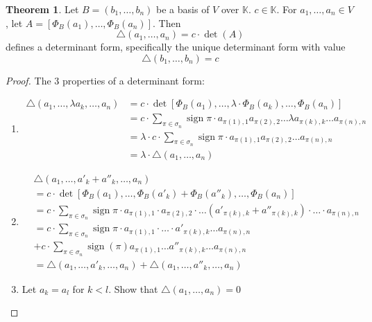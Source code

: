 \documentclass[a4paper,landscape,twocolumn]{article}
\theoremstyle{definition}
\newtheorem{theorem}{Theorem}
\DeclareMathOperator\sign{sign}
\begin{document}
\begin{theorem}
  \label{satz-7.22}
  Let $B = (b_1, \ldots, b_n)$ be a basis of $V$ over $\mathbb K$. $c \in \mathbb K$.
  For $a_1, \ldots, a_n \in V$, let $A = \left[\Phi_B(a_1), \ldots, \Phi_B(a_n)\right]$.
  Then
  \[ \triangle(a_1, \ldots, a_n) = c \cdot \det(A) \]
  defines a determinant form, specifically the unique determinant form with value
  \[ \triangle(b_1, \ldots, b_n) = c \]
\end{theorem}
\begin{proof}
  The 3 properties of a determinant form:
  \begin{enumerate}
    \item
      \begin{align*}
        \triangle(a_1, \ldots, \lambda a_k, \ldots, a_n)
        &= c \cdot \det\left[\Phi_B(a_1), \ldots, \lambda \cdot \Phi_B(a_k), \ldots, \Phi_B(a_n)\right] \\
        &= c \cdot \sum_{\pi \in \sigma_n} \sign{\pi} \cdot a_{\pi(1),1} a_{\pi(2),2} \ldots \lambda a_{\pi(k),k} \ldots a_{\pi(n),n} \\
        &= \lambda \cdot c \cdot \sum_{\pi \in \sigma_n} \sign{\pi} \cdot a_{\pi(1),1} a_{\pi(2),2} \ldots a_{\pi(n),n} \\
        &= \lambda \cdot \triangle(a_1, \ldots, a_n)
      \end{align*}
    \item
      \begin{align*}
        & \triangle(a_1, \ldots, a'_k + a''_k, \ldots, a_n) \\
          &= c \cdot \det\left[\Phi_B(a_1), \ldots, \Phi_B(a'_k) + \Phi_B(a''_k), \ldots, \Phi_B(a_n)\right] \\
          &= c \cdot \sum_{\pi \in \sigma_n} \sign{\pi} \cdot a_{\pi(1),1} \cdot a_{\pi(2),2} \cdot \ldots
             \left(a'_{\pi(k),k} + a''_{\pi(k),k}\right) \cdot \ldots \cdot a_{\pi(n),n} \\
          &= c \cdot \sum_{\pi \in \sigma_n} \sign{\pi} \cdot a_{\pi(1),1} \cdot \ldots \cdot a'_{\pi(k),k} \ldots a_{\pi(n),n} \\
          &+ c \cdot \sum_{\pi \in \sigma_n} \sign(\pi) a_{\pi(1),1} \ldots a''_{\pi(k),k} \ldots a_{\pi(n),n} \\
          &= \triangle(a_1, \ldots, a'_k, \ldots, a_n) + \triangle(a_1, \ldots, a''_k, \ldots, a_n)
      \end{align*}
    \item
      Let $a_k = a_l$ for $k < l$. Show that $\triangle(a_1, \ldots, a_n) = 0$

\end{enumerate}
\end{proof}
\end{document}

